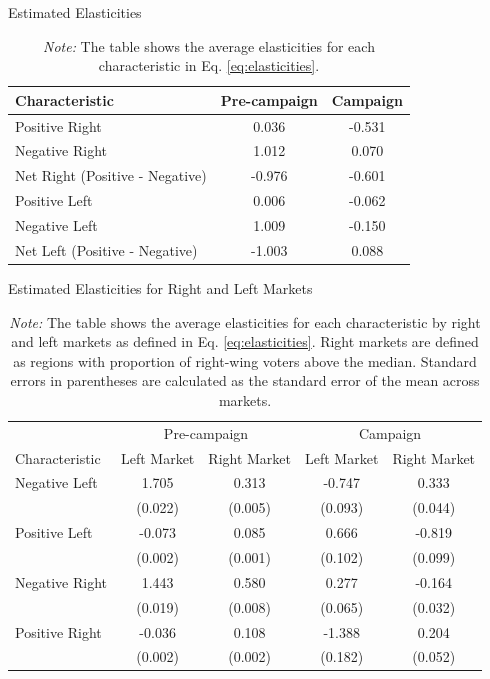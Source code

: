 \documentclass[12pt]{article}
\begin{document}
\begin{table}[!htb]
	\centering
	\caption{Estimated Elasticities}
	\begin{tabular}{lcc}
		\toprule
		Characteristic & \textbf{Pre-campaign}& \textbf{Campaign} \\
		\midrule
		Positive Right & 0.036 & -0.531 \\
		Negative Right & 1.012 & 0.070 \\
		Net Right (Positive - Negative) & -0.976 & -0.601 \\
		\hline
		Positive Left & 0.006 & -0.062 \\
		Negative Left & 1.009 & -0.150 \\
		Net Left (Positive - Negative) & -1.003 & 0.088 \\
		\bottomrule
	\end{tabular}
	\caption*{\textit{Note:} \small The table shows the average elasticities for each characteristic in Eq. \eqref{eq:elasticities}. }
	\label{tab:elasticities0}
\end{table}





\begin{table}[!htb]
	\centering
	\caption{Estimated Elasticities for Right and Left Markets}
	\begin{tabular}{l|cc|cc}
		\toprule
		& \multicolumn{2}{c|}{Pre-campaign} & \multicolumn{2}{c}{Campaign} \\
		Characteristic & Left Market & Right Market & Left Market & Right Market \\
		\midrule
		Negative Left & 1.705 & 0.313 & -0.747 & 0.333 \\
		& (0.022) & (0.005) & (0.093) & (0.044) \\
		Positive Left & -0.073 & 0.085 & 0.666 & -0.819 \\
		& (0.002) & (0.001) & (0.102) & (0.099) \\
		Negative Right & 1.443 & 0.580 & 0.277 & -0.164 \\
		& (0.019) & (0.008) & (0.065) & (0.032) \\
		Positive Right & -0.036 & 0.108 & -1.388 & 0.204 \\
		& (0.002) & (0.002) & (0.182) & (0.052) \\
		\bottomrule
	\end{tabular}
	\caption*{\textit{Note:} \small The table shows the average elasticities for each characteristic by right and left markets as defined in Eq. \eqref{eq:elasticities}. Right markets are defined as regions with proportion of right-wing voters above the median. Standard errors in parentheses are calculated as the standard error of the mean across markets.}
	\label{tab:elasticities}
\end{table}
\end{document}
